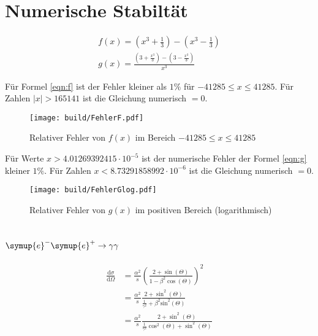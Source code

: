 



\section{Numerische Stabiltät}

\begin{gather}
  f(x)=\left(x^3+\frac{1}{3}\right)-\left(x^3-\frac{1}{3}\right)\label{eqn:f}\\
  g(x)=\frac{\left(3+\frac{x^3}{3}\right)-\left(3-\frac{x^3}{3}\right)}{x^3}\label{eqn:g}
\end{gather}

\noindent Für Formel \eqref{eqn:f} ist der Fehler kleiner als $1\%$ für $-41285 \leq x \leq 41285$.
Für Zahlen $|x|>165141$ ist die Gleichung numerisch $=0$.

\begin{figure}
  \centering
  \texttt{[image: build/FehlerF.pdf]}
  \caption{Relativer Fehler von $f(x)$ im Bereich $-41285 \leq x \leq 41285$}
  \label{fig:FehlerF}
\end{figure}

\noindent Für Werte $x>4.01269392415 \cdot 10^{-5}$ ist der numerische Fehler der Formel \eqref{eqn:g} kleiner $1\%$.
Für Zahlen $x<8.73291858992 \cdot 10^{-6}$ ist die Gleichung numerisch $=0$.

\begin{figure}
  \centering
  \texttt{[image: build/FehlerGlog.pdf]}
  \caption{Relativer Fehler von $g(x)$ im positiven Bereich (logarithmisch)}
  \label{fig:FehlerGlog}
\end{figure}

\section{\texorpdfstring{$\symup{e}^-\symup{e}^+\rightarrow\gamma \gamma$}{Paarvernichtung}}

\begin{align}
    \frac{\mathrm{d}\sigma}{\mathrm{d}\Omega} &= \frac{\alpha^2}{s} \left(\frac{2+\sin(\Theta)}{1-\beta^2 \cos(\Theta)}\right)^2\label{eqn:WQStandard}\\
&= \frac{\alpha^2}{s} \frac{2+\sin^2(\Theta)}{\frac{1}{\gamma^2}+\beta^2 \text{sin}^2(\Theta)}\\
&= \frac{\alpha^2}{s}\frac{2+\sin^2(\Theta)}{\frac{1}{\gamma^2}\cos^2(\Theta)+\sin^2(\Theta)}\label{eqn:WQModifiziert}
\end{align}


